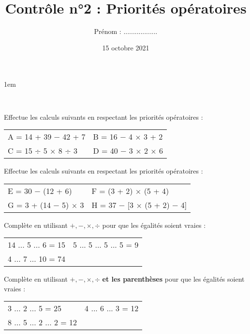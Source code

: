 \documentclass[a4paper,11pt]{article}
\title{Contrôle n°2 : Priorités opératoires}
\date{15 octobre 2021}
\author{Prénom : ..................}
\makeatletter
\renewcommand{\maketitle}{%
    \topskip1em
	\@author \hfill \@date \\

	\begin{center}
		\begin{huge}
			\@title \\[1em]
		\end{huge}
	\end{center}
}
\makeatother
\begin{document}
\maketitle

\begin{question}[(4 points)] Effectue les calculs suivants en respectant les priorités opératoires :

	\noindent
	\begin{tabular}{p{}|p{}}
		A = 14 + 39 − 42 + 7 & B = 16 − 4 × 3 + 2 \vspace{8em}  \\
		C = 15 ÷ 5 × 8 ÷ 3   & D = 40 − 3 × 2 × 6  \vspace{8em}
	\end{tabular}
\end{question}

\begin{question}[(4 points)] Effectue les calculs suivants en respectant les priorités opératoires :

	\noindent
	\begin{tabular}{p{}|p{}}
		E = 30 − (12 + 6)    & F = (3 + 2) × (5 + 4) \vspace{9em}      \\
		G = 3 + (14 − 5) × 3 & H = 37 − [3 × (5 + 2) − 4] \vspace{9em}
	\end{tabular}
\end{question}

\begin{question}[(3 points)] Complète en utilisant $+,-,×,÷$ pour que les égalités soient vraies :

	\vspace{1em}
	\noindent
	\begin{tabular}{p{}p{}}
		14 ... 5 ... 6 = 15       &
		5 ... 5 ... 5 ... 5 = 9 \vspace{0.5em} \\
		4 ... 7 ... 10 = 74 &
	\end{tabular}
	\vspace{1em}

	Complète en utilisant $+,-,×,÷$ \textbf{et les parenthèses} pour que les égalités soient vraies :

	\vspace{1em}
	\noindent
	\begin{tabular}{p{}p{}}
		3 ... 2 ... 5 = 25       &
		4 ... 6 ... 3 = 12 \vspace{0.5em} \\
		8 ... 5 ... 2 ... 2 = 12 &
	\end{tabular}
	\vspace{1em}
\end{question}
\end{document}
